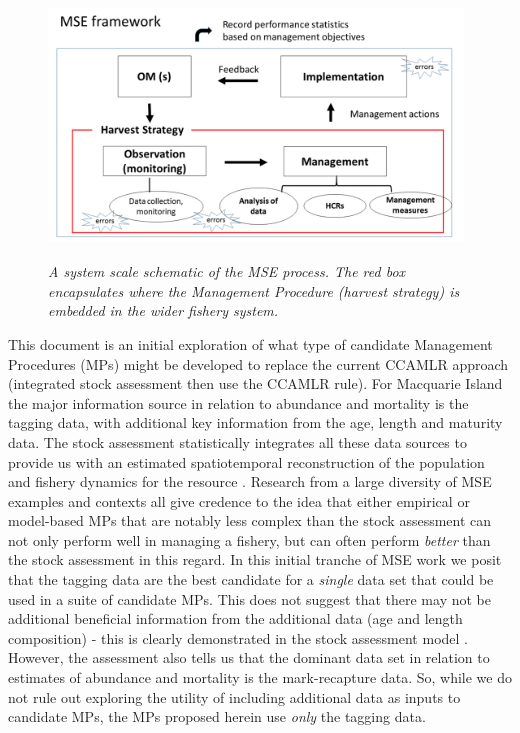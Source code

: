 \documentclass[12pt,a4paper,twoside,times,sky,standard]{csiroreport2017}
\begin{document}
\begin{figure}[hb]
    \begin{center}
        \includegraphics[width=11cm,height=7cm]{figs/MSE.pdf}
    \end{center}
    \caption{\textit{A system scale schematic of the MSE process. The red box encapsulates where the Management Procedure (harvest strategy) is embedded in the wider fishery system.}}
\end{figure}

This document is an initial exploration of what type of candidate Management Procedures (MPs) might be developed to replace the current CCAMLR approach (integrated stock assessment then use the CCAMLR rule). For Macquarie Island the major information source in relation to abundance and mortality is the tagging data, with additional key information from the age, length and maturity data. The stock assessment statistically integrates all these data sources to provide us with an estimated spatiotemporal reconstruction of the population and fishery dynamics for the resource \cite{misa}. Research from a large diversity of MSE examples and contexts \cite{mse,iwc,sbtmp,mprev} all give credence to the idea that either empirical or model-based MPs that are notably less complex than the stock assessment can not only perform well in managing a fishery, but can often perform \emph{better} than the stock assessment in this regard. In this initial tranche of MSE work we posit that the tagging data are the best candidate for a \emph{single} data set that could be used in a suite of candidate MPs. This does not suggest that there may not be additional beneficial information from the additional data (age and length composition) - this is clearly demonstrated in the stock assessment model \cite{misa}. However, the assessment also tells us that the dominant data set in relation to estimates of abundance and mortality is the mark-recapture data. So, while we do not rule out exploring the utility of including additional data as inputs to candidate MPs, the MPs proposed herein use \emph{only} the tagging data.
\end{document}
